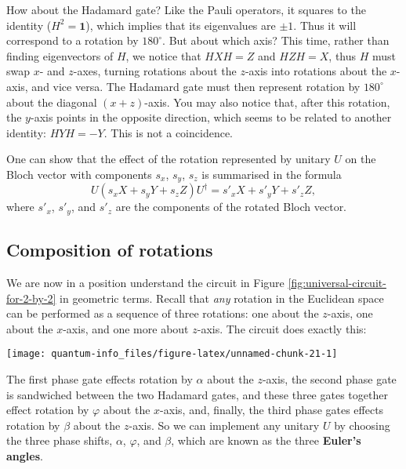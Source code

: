 \documentclass[fleqn]{article}
\renewcommand{\footnote}[1]{\en{#1}}
\begin{document}
How about the Hadamard gate?
Like the Pauli operators, it squares to the identity (\(H^2=\mathbf{1}\)), which implies that its eigenvalues are \(\pm 1\).
Thus it will correspond to a rotation by \({180}^{\circ}\).
But about which axis?
This time, rather than finding eigenvectors of \(H\), we notice that \(HXH=Z\) and \(HZH=X\), thus \(H\) must swap \(x\)- and \(z\)-axes, turning rotations about the \(z\)-axis into rotations about the \(x\)-axis, and vice versa.
The Hadamard gate must then represent rotation by \({180}^{\circ}\) about the diagonal \((x+z)\)-axis.
You may also notice that, after this rotation, the \(y\)-axis points in the opposite direction, which seems to be related to another identity: \(HYH=-Y\).
This is not a coincidence.

One can show\footnote{Again, see \protect\hyperlink{chapter3}{Chapter 3}.} that the effect of the rotation represented by unitary \(U\) on the Bloch vector with components \(s_x\), \(s_y\), \(s_z\) is summarised in the formula
\[
  U (s_x X + s_y Y + s_z Z) U^\dagger
  = s'_x X+ s'_y Y + s'_z Z,
\]
where \(s'_x\), \(s'_y\), and \(s'_z\) are the components of the rotated Bloch vector.

\hypertarget{composition-of-rotations}{%
\subsection{Composition of rotations}\label{composition-of-rotations}}

We are now in a position understand the circuit in Figure \ref{fig:universal-circuit-for-2-by-2} in geometric terms.
Recall that \emph{any} rotation in the Euclidean space can be performed as a sequence of three rotations: one about the \(z\)-axis, one about the \(x\)-axis, and one more about \(z\)-axis.
The circuit does exactly this:

\begin{center}\texttt{[image: quantum-info\_files/figure-latex/unnamed-chunk-21-1]} \end{center}

The first phase gate effects rotation by \(\alpha\) about the \(z\)-axis, the second phase gate is sandwiched between the two Hadamard gates, and these three gates together effect rotation by \(\varphi\) about the \(x\)-axis, and, finally, the third phase gates effects rotation by \(\beta\) about the \(z\)-axis.
So we can implement any unitary \(U\) by choosing the three phase shifts, \(\alpha\), \(\varphi\), and \(\beta\), which are known as the three \textbf{Euler's angles}.
\end{document}

